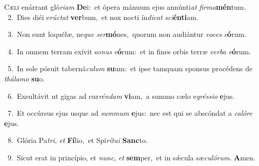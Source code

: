 \lettrine{\initial\textcolor{\initialcolor}{C}}{æli} enárrant gló\-\textit{ri}\-\textit{am} \textbf{De}\-i:~\star et ópera mánuum ejus annúnti\textit{at} \textit{fir}\-\textit{ma}\textbf{mén}tum.\\
{\numbfont\textcolor{\numbcolor}{~2.}}~Dies diéi e\-\textit{rúc}\-\textit{tat} \textbf{ver}\-bum,~\star et nox nocti ín\-\textit{di}\-\textit{cat} \textit{sci}\-\textbf{én}\textbf{ti}am.\par
{\numbfont\textcolor{\numbcolor}{~3.}}~Non sunt loquélæ, ne\textit{que} \textit{ser}\-\textbf{mó}nes,~\star quorum non audiántur \textit{vo}\-\textit{ces} \textit{e}\-\textbf{ó}rum.\par
{\numbfont\textcolor{\numbcolor}{~4.}}~In omnem terram exívit so\textit{nus} \textit{e}\-\textbf{ó}rum:~\star et in fines orbis terræ \textit{ver}\-\textit{ba} \textit{e}\-\textbf{ó}rum.\par
{\numbfont\textcolor{\numbcolor}{~5.}}~In sole pósuit taberná\-\textit{cu}\-\textit{lum} \textbf{su}\-um:~\star et ipse tamquam sponsus procédens de \textit{thá}\-\textit{la}\textit{mo} \textbf{su}\-o.\par
{\numbfont\textcolor{\numbcolor}{~6.}}~Exsultávit ut gigas ad cur\-\textit{rén}\-\textit{dam} \textbf{vi}\-am,~\star a summo cælo e\-\textit{grés}\-\textit{si}\textit{o} \textbf{e}\-jus.\par
{\numbfont\textcolor{\numbcolor}{~7.}}~Et occúrsus ejus usque ad \textit{sum}\-\textit{mum} \textbf{e}\-jus:~\star nec est qui se abscóndat a \textit{ca}\-\textit{ló}\textit{re} \textbf{e}\-jus.\par
{\numbfont\textcolor{\numbcolor}{~8.}}~Glória Pa\-\textit{tri}\-, \textit{et} \textbf{Fí}\-lio,~\star et Spi\-\textit{rí}\-\textit{tu}\textit{i} \textbf{Sanc}\-to.\par
{\numbfont\textcolor{\numbcolor}{~9.}}~Sicut erat in princípio, et \textit{nunc}\-, \textit{et} \textbf{sem}\-per,~\star et in sǽcula sæ\-\textit{cu}\-\textit{ló}\textit{rum}. \textbf{A}\-men.\par
